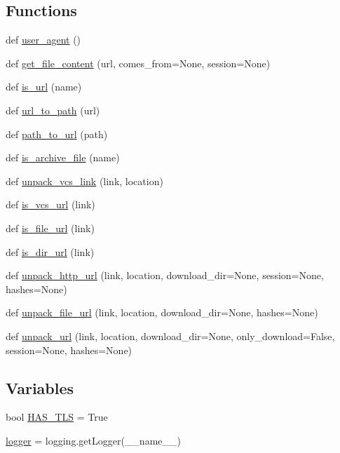 \subsection*{Functions}
\begin{DoxyCompactItemize}
\item 
def \hyperlink{namespacepip_1_1download_a1adf8d9a00b88ff01bb5de6168965549}{user\+\_\+agent} ()
\item 
def \hyperlink{namespacepip_1_1download_aff76caa03b1aca7c40ca9ba67fe85580}{get\+\_\+file\+\_\+content} (url, comes\+\_\+from=None, session=None)
\item 
def \hyperlink{namespacepip_1_1download_afec89d460aaf7de168f8f2423dbb08b0}{is\+\_\+url} (name)
\item 
def \hyperlink{namespacepip_1_1download_ad818b3bf9d9360957de154b2d3a35629}{url\+\_\+to\+\_\+path} (url)
\item 
def \hyperlink{namespacepip_1_1download_a7297c9435d47ee6174bded394c991c2a}{path\+\_\+to\+\_\+url} (path)
\item 
def \hyperlink{namespacepip_1_1download_a81e68dcf701c507fefeff41b73a93f42}{is\+\_\+archive\+\_\+file} (name)
\item 
def \hyperlink{namespacepip_1_1download_a9059fb2bd4b17f476f692a556eeeace9}{unpack\+\_\+vcs\+\_\+link} (link, location)
\item 
def \hyperlink{namespacepip_1_1download_a178d555d11b1cca09822a4d4ef5bac64}{is\+\_\+vcs\+\_\+url} (link)
\item 
def \hyperlink{namespacepip_1_1download_ac03d1f30794f44be8cac701ef45c54de}{is\+\_\+file\+\_\+url} (link)
\item 
def \hyperlink{namespacepip_1_1download_af644adf56a465c06667edaab9ec093a3}{is\+\_\+dir\+\_\+url} (link)
\item 
def \hyperlink{namespacepip_1_1download_ad5084221b7a7bd5dd25924defc00e79d}{unpack\+\_\+http\+\_\+url} (link, location, download\+\_\+dir=None, session=None, hashes=None)
\item 
def \hyperlink{namespacepip_1_1download_ae6e106ffe2dffa7730badf96e678d849}{unpack\+\_\+file\+\_\+url} (link, location, download\+\_\+dir=None, hashes=None)
\item 
def \hyperlink{namespacepip_1_1download_a89f50969cc2d8f8ecf384c7b4f1a4031}{unpack\+\_\+url} (link, location, download\+\_\+dir=None, only\+\_\+download=False, session=None, hashes=None)
\end{DoxyCompactItemize}
\subsection*{Variables}
\begin{DoxyCompactItemize}
\item 
bool \hyperlink{namespacepip_1_1download_a76157632746f2b98b33010db6ebbad83}{H\+A\+S\+\_\+\+T\+LS} = True
\item 
\hyperlink{namespacepip_1_1download_ac16ff9630d200de4db31f3da4ca8352f}{logger} = logging.\+get\+Logger(\+\_\+\+\_\+name\+\_\+\+\_\+)
\end{DoxyCompactItemize}


